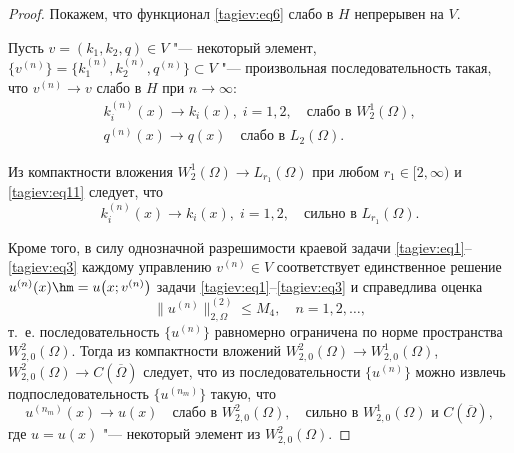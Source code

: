 \begin{proof} Покажем, что функционал \eqref{tagiev:eq6} слабо в $H$ непрерывен 
на $V$. 

Пусть $ v  = (k_1,k_2,q)\in V$ "--- некоторый 
элемент, $\{ v ^{( n )} \}= \bigl \{ k_1^{ ( n )}, k_2^{ ( n )},q^{ ( n )} \bigr\}\subset V$ "--- произвольная последовательность такая, что 
$ v  ^{ ( n )}\to  v  $ слабо в $H$ при $n\to \infty $: 
\begin{gather}
\label{tagiev:eq11}
k_i^{ ( n )} ( x ) \to k_i ( x ) ,\;  i=1,2, \quad \text{слабо в } W_2^1( \Omega ),\\ 
\label{tagiev:eq12}
q^{( n )} ( x )\to q ( x ) \quad \text{слабо в } L_2 ( \Omega ).
\end{gather}

Из компактности вложения $W_2^1 ( \Omega )\to L_{r_1 } (\Omega )$ при любом $r_1 \in [2,\infty)$ \cite[с.~84]{tagiev:bib15} и \eqref{tagiev:eq11} следует, что
\begin{equation}
\label{tagiev:eq13}
k_i^{( n )} ( x )\to k_i ( x ), \; i=1, 2 , \quad \text{сильно в } L_{r_1}(\Omega).
\end{equation}

Кроме того, в силу однозначной разрешимости краевой задачи \eqref{tagiev:eq1}--\eqref{tagiev:eq3} каждому 
управлению $ v  ^{ ( n )}\in V$ соответствует единственное 
решение $u^{ ( n )} ( x ) \hm =u \big( x; v  ^{ (n)} \big)$ задачи \eqref{tagiev:eq1}--\eqref{tagiev:eq3} и справедлива оценка 
\begin{equation}
\label{tagiev:eq14}
\| u^{ ( n )} \|_{2,\Omega}^{ ( 2 )} \le M_4 , \quad n=1,2,\ldots,
\end{equation}
т.~е. последовательность $ \{ u^{ ( n )} \}$ равномерно  ограничена по норме пространства $W_{2,0}^2 ( \Omega )$. Тогда из  компактности вложений $W_{2,0}^2 ( \Omega )\to W_{2,0}^1 ( \Omega)$, 
$W_{2,0}^2 ( \Omega )\to C ( \overline \Omega )$ \cite[с.~84]{tagiev:bib15} следует, что из последовательности
$ \{u^{ ( n )}  \}$ можно извлечь подпоследовательность  $ \{u^{ ( {n_m } )} \}$ такую, что 
\begin{equation}
\label{tagiev:eq15}
u^{ (n_m )} ( x )\to u ( x ) \quad \text{слабо в } W_{2,0}^2 ( \Omega ), \quad \text{сильно в } W_{2,0}^1 (\Omega) \text{ и } C (\overline \Omega ),
\end{equation}
где $u=u ( x )$ "--- некоторый элемент из $W_{2,0}^2 ( \Omega )$.





\end{proof}
